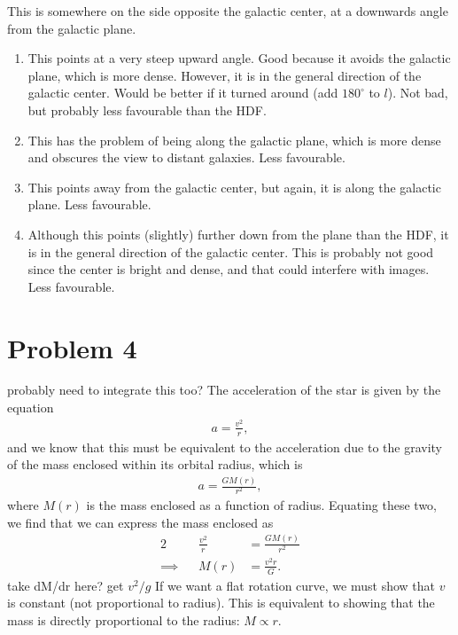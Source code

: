 \documentclass[11pt,letterpaper]{article}
\begin{document}
This is somewhere on the side opposite the galactic center, at a downwards angle from the galactic plane. 

\begin{enumerate}[label=(\arabic*)]
    \item This points at a very steep upward angle. Good because it avoids the galactic plane, which is more dense. However, it is in the general direction of the galactic center. Would be better if it turned around (add $180^\circ$ to $l$). Not bad, but probably less favourable than the HDF. 
    \item This has the problem of being along the galactic plane, which is more dense and obscures the view to distant galaxies. Less favourable.
    \item This points away from the galactic center, but again, it is along the galactic plane. Less favourable. 
    \item Although this points (slightly) further down from the plane than the HDF, it is in the general direction of the galactic center. This is probably not good since the center is bright and dense, and that could interfere with images. Less favourable.
\end{enumerate}


\section*{Problem 4} 

{\huge probably need to integrate this too?}
The acceleration of the star is given by the equation 
        \begin{align*}
            a = \frac{v^2}{r},
        \end{align*}
        and we know that this must be equivalent to the acceleration due to the gravity of the mass enclosed within its orbital radius, which is 
        \begin{align*}
            a = \frac{GM(r)}{r^2},
        \end{align*}
        where $M(r)$ is the mass enclosed as a function of radius.
        Equating these two, we find that we can express the mass enclosed as 
        \begin{alignat*}{2}
            &&\frac{v^2}{r} &= \frac{GM(r)}{r^2} \\
            \implies&&M(r) &= \frac{v^2r}{G}.
        \end{alignat*}
        {\huge take dM/dr here? get $v^2/g$}
        If we want a flat rotation curve, we must show that $v$ is constant (not proportional to radius). This is equivalent to showing that the mass is directly proportional to the radius: $M \propto r$. 
\end{document}
